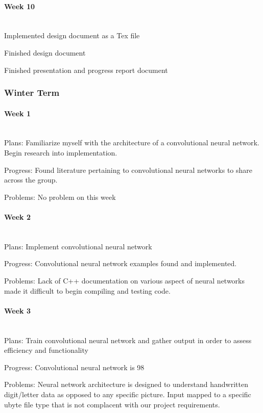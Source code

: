 \documentclass[article, onecolumn, draftclsnofoot,10pt, compsoc]{IEEEtran}
\begin{document}
\paragraph{Week 10}
\mbox{}\\
Implemented design document as a Tex file 

Finished design document 

Finished presentation and progress report document 

\subsubsection{Winter Term}
\paragraph{Week 1}
\mbox{}\\
Plans: 
Familiarize myself with the architecture of a convolutional neural network. Begin research into implementation. 
 
Progress:  
Found literature pertaining to convolutional neural networks to share across the group. 
 
Problems: 
No problem on this week
\paragraph{Week 2}
\mbox{}\\
Plans: 
Implement convolutional neural network 
 
Progress: 
Convolutional neural network examples found and implemented. 
 
Problems: 
Lack of C++ documentation on various aspect of neural networks made it difficult to begin compiling and testing code. 

\paragraph{Week 3}
\mbox{}\\
Plans: 
Train convolutional neural network and gather output in order to assess efficiency and functionality 
 
Progress: 
Convolutional neural network is 98%
 
Problems: 
Neural network architecture is designed to understand handwritten digit/letter data as opposed to any specific picture. Input mapped to a specific ubyte file type that is not complacent with our project requirements. 
\end{document}
